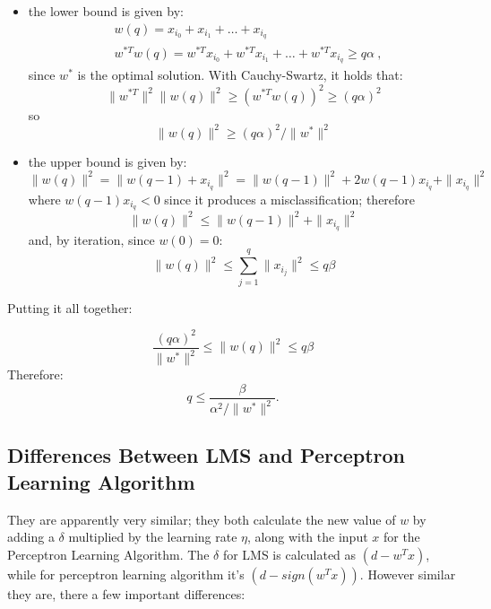 \begin{itemize}
    \item the lower bound is given by:
    \begin{align*}
        &w(q) = x_{i_0} + x_{i_1} + \dots + x_{i_q} \\
        &w^{*T}w(q) = w^{*T}x_{i_0} + w^{*T}x_{i_1} + \dots + w^{*T}x_{i_q} \geq q \alpha \ ,
    \end{align*}
    since $w^*$ is the optimal solution.
    With Cauchy-Swartz, it holds that:
    \begin{equation*}
        \|w^{*T}\|^2\|w(q)\|^2 \geq (w^{*T}w(q))^2 \geq (q \alpha)^2
    \end{equation*}
    so
    \begin{equation*}
        \|w(q)\|^2 \geq (q \alpha)^2 / \|w^*\|^2
    \end{equation*}

    \item the upper bound is given by:
    \begin{equation*}
        \|w(q)\|^2 = \|w(q-1) + x_{i_q}\|^2 = \|w(q-1)\|^2 + 2w(q-1)x_{i_q} + \|x_{i_q}\|^2
    \end{equation*}
    where $w(q-1)x_{i_q} < 0$ since it produces a misclassification; therefore
    \begin{equation*}
        \|w(q)\|^2 \leq \|w(q-1)\|^2 + \|x_{i_q}\|^2
    \end{equation*}
    and, by iteration, since $w(0) = 0$:
    \begin{equation*}
        \|w(q)\|^2 \leq \sum_{j=1}^q \|x_{i_j}\|^2 \leq q \beta
    \end{equation*}
    
\end{itemize}
Putting it all together:

\begin{equation*}
    \dfrac{(q \alpha)^2}{\|w^*\|^2} \leq \|w(q)\|^2 \leq q \beta
\end{equation*}
Therefore:
\begin{equation*}
    q \leq \dfrac{\beta}{\alpha^2 / \|w^*\|^2}.
\end{equation*}


\subsection{Differences Between LMS and Perceptron Learning Algorithm}

They are apparently very similar; they both calculate the new value of $w$ by adding a $\delta$ multiplied by the learning rate $\eta$, along with the input $x$ for the Perceptron Learning Algorithm. The $\delta$ for LMS is calculated as $(d - w^Tx)$, while for perceptron learning algorithm it's $(d - sign(w^Tx))$. However similar they are, there a few important differences:

